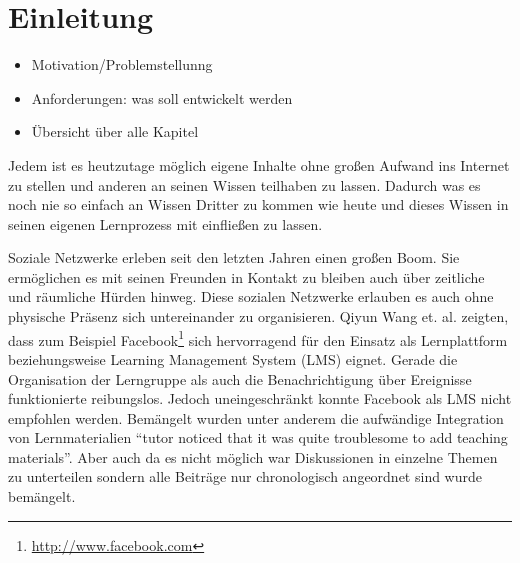 
\chapter{Einleitung} %
\label{cha:einleitung}

\begin{itemize}
    \item Motivation/Problemstellunng
    \item Anforderungen: was soll entwickelt werden
    \item Übersicht über alle Kapitel
\end{itemize}


Jedem ist es heutzutage möglich eigene Inhalte ohne großen Aufwand ins Internet zu stellen und anderen an seinen Wissen teilhaben zu lassen. Dadurch was es noch nie so einfach an Wissen Dritter zu kommen wie heute und dieses Wissen in seinen eigenen Lernprozess mit einfließen zu lassen. 

\medskip

Soziale Netzwerke erleben seit den letzten Jahren einen großen Boom. Sie ermöglichen es mit seinen Freunden in Kontakt zu bleiben auch über zeitliche und räumliche Hürden hinweg. Diese sozialen Netzwerke erlauben es auch ohne physische Präsenz sich untereinander zu organisieren. Qiyun Wang et. al. \cite{Wang2012} zeigten, dass zum Beispiel Facebook\footnote{\url{http://www.facebook.com}} sich hervorragend für den Einsatz als Lernplattform beziehungsweise Learning Management System (LMS) eignet. Gerade die Organisation der Lerngruppe als auch die Benachrichtigung über Ereignisse funktionierte reibungslos. Jedoch uneingeschränkt konnte Facebook als LMS nicht empfohlen werden. Bemängelt wurden unter anderem die aufwändige Integration von Lernmaterialien \enquote{tutor noticed that it was quite troublesome to add teaching materials}\cite[S.\,435]{Wang2012}. Aber auch da es nicht möglich war Diskussionen in einzelne Themen zu unterteilen sondern alle Beiträge nur chronologisch angeordnet sind wurde bemängelt.

